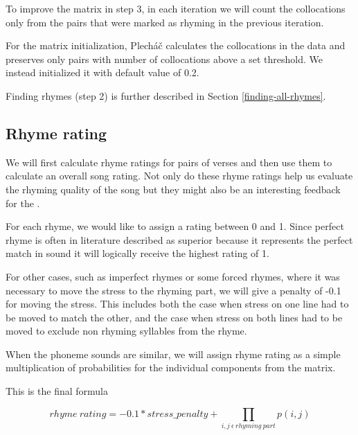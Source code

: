 To improve the matrix in step 3, in each iteration we will count the collocations only from the pairs that were marked as rhyming in the previous iteration.

For the matrix initialization, Plecháč calculates the collocations in the data and preserves only pairs with number of collocations above a set threshold. We instead initialized it with  default value of 0.2. 

Finding rhymes (step 2) is further described in Section \ref{finding-all-rhymes}.


\subsection{Rhyme rating}\label{rhyme-rating}
 We will first calculate rhyme ratings for pairs of verses and then use them to calculate an overall song rating. Not only do these rhyme ratings help us evaluate the rhyming quality of the song but they might also be an interesting feedback for the .
 
 
 For each rhyme, we would like to assign a rating between 0 and 1. Since perfect rhyme is often in literature described as superior because it represents the perfect match in sound it will logically receive the highest rating of 1.
 
 For other cases, such as imperfect rhymes or some forced rhymes, where it was necessary to move the stress to the rhyming part, we will give a penalty of -0.1 for moving the stress. This includes both the case when stress on one line had to be moved to match the other, and the case when stress on both lines had to be moved to exclude non rhyming syllables from the rhyme.
  
	When the phoneme sounds are similar, we will assign rhyme rating as a simple multiplication of probabilities for the individual components from the matrix. 

This is the final formula
	
	\[rhyme\ rating = -0.1 * stress\_penalty + \prod_{i,j\ \epsilon\ rhyming\ part} p(i,j) \]
	
